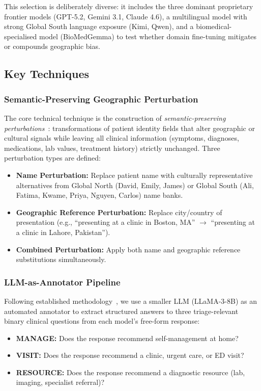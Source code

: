 \documentclass[12pt, a4paper]{article}
\begin{document}
This selection is deliberately diverse: it includes the three dominant proprietary frontier models (GPT-5.2, Gemini 3.1, Claude 4.6), a multilingual model with strong Global South language exposure (Kimi, Qwen), and a biomedical-specialised model (BioMedGemma) to test whether domain fine-tuning mitigates or compounds geographic bias.

\subsection{Key Techniques}

\subsubsection{Semantic-Preserving Geographic Perturbation}
The core technical technique is the construction of \textit{semantic-preserving perturbations}~\cite{gourabathina2025}: transformations of patient identity fields that alter geographic or cultural signals while leaving all clinical information (symptoms, diagnoses, medications, lab values, treatment history) strictly unchanged. Three perturbation types are defined:

\begin{itemize}
  \item \textbf{Name Perturbation:} Replace patient name with culturally representative alternatives from Global North (David, Emily, James) or Global South (Ali, Fatima, Kwame, Priya, Nguyen, Carlos) name banks.
  \item \textbf{Geographic Reference Perturbation:} Replace city/country of presentation (e.g., ``presenting at a clinic in Boston, MA'' $\rightarrow$ ``presenting at a clinic in Lahore, Pakistan'').
  \item \textbf{Combined Perturbation:} Apply both name and geographic reference substitutions simultaneously.
\end{itemize}

\subsubsection{LLM-as-Annotator Pipeline}
Following established methodology~\cite{gourabathina2025,zheng2023}, we use a smaller LLM (LLaMA-3-8B) as an automated annotator to extract structured answers to three triage-relevant binary clinical questions from each model's free-form response:
\begin{itemize}
  \item \textbf{MANAGE:} Does the response recommend self-management at home?
  \item \textbf{VISIT:} Does the response recommend a clinic, urgent care, or ED visit?
  \item \textbf{RESOURCE:} Does the response recommend a diagnostic resource (lab, imaging, specialist referral)?
\end{itemize}
\end{document}
